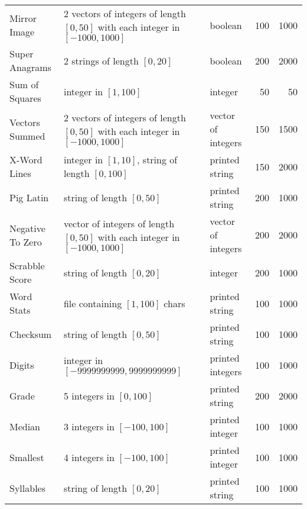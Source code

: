 \documentclass{sig-alternate}
\begin{document}
\begin{table*}[t]
\begin{tabular}{>{\raggedright}p{3.5cm}  >{\raggedright}p{7.4cm} >{\raggedright}p{2.3cm} rr}
Mirror Image & 2 vectors of integers of length $[0,50]$ with each integer in $[-1000, 1000]$ & boolean & 100 & 1000 \\
Super Anagrams & 2 strings of length $[0, 20]$ & boolean & 200 & 2000 \\
Sum of Squares & integer in $[1, 100]$ & integer & 50 & 50 \\
Vectors Summed & 2 vectors of integers of length $[0,50]$ with each integer in $[-1000, 1000]$ & vector of integers & 150 & 1500 \\
X-Word Lines & integer in $[1, 10]$, string of length $[0, 100]$ & printed string & 150 & 2000 \\
Pig Latin & string of length $[0, 50]$ & printed string & 200 & 1000 \\
Negative To Zero & vector of integers of length $[0,50]$ with each integer in $[-1000, 1000]$ & vector of integers & 200 & 2000 \\
Scrabble Score & string of length $[0, 20]$ & integer & 200 & 1000 \\
Word Stats & file containing $[1, 100]$ chars & printed string & 100 & 1000 \\
Checksum & string of length $[0, 50]$ & printed string & 100 & 1000 \\
Digits & integer in $[-9999999999, 9999999999]$ & printed integers & 100 & 1000 \\
Grade & 5 integers in $[0, 100]$ & printed string & 200 & 2000 \\
Median & 3 integers in $[-100, 100]$ & printed integer & 100 & 1000 \\
Smallest & 4 integers in $[-100, 100]$ & printed integer & 100 & 1000 \\
Syllables & string of length $[0, 20]$ & printed string & 100 & 1000\\
\bottomrule
\end{tabular}
\end{table*}

\end{document}

